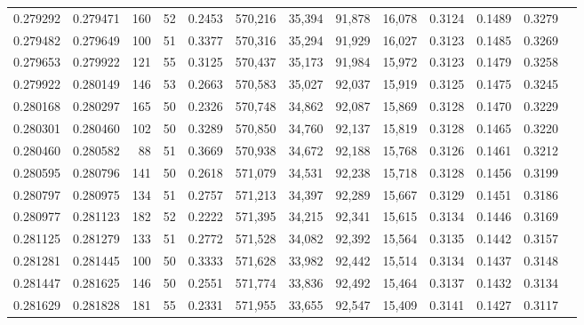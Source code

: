 \begin{tabular}{rrrrrrrrrrrrr}
0.279292 & 0.279471 &   160 &  52 &                                     0.2453 & 570,216 &  35,394 &  91,878 &  16,078 & 0.3124 & 0.1489 & 0.3279 \\
0.279482 & 0.279649 &   100 &  51 &                                     0.3377 & 570,316 &  35,294 &  91,929 &  16,027 & 0.3123 & 0.1485 & 0.3269 \\
0.279653 & 0.279922 &   121 &  55 &                                     0.3125 & 570,437 &  35,173 &  91,984 &  15,972 & 0.3123 & 0.1479 & 0.3258 \\
0.279922 & 0.280149 &   146 &  53 &                                     0.2663 & 570,583 &  35,027 &  92,037 &  15,919 & 0.3125 & 0.1475 & 0.3245 \\
0.280168 & 0.280297 &   165 &  50 &                                     0.2326 & 570,748 &  34,862 &  92,087 &  15,869 & 0.3128 & 0.1470 & 0.3229 \\
0.280301 & 0.280460 &   102 &  50 &                                     0.3289 & 570,850 &  34,760 &  92,137 &  15,819 & 0.3128 & 0.1465 & 0.3220 \\
0.280460 & 0.280582 &    88 &  51 &                                     0.3669 & 570,938 &  34,672 &  92,188 &  15,768 & 0.3126 & 0.1461 & 0.3212 \\
0.280595 & 0.280796 &   141 &  50 &                                     0.2618 & 571,079 &  34,531 &  92,238 &  15,718 & 0.3128 & 0.1456 & 0.3199 \\
0.280797 & 0.280975 &   134 &  51 &                                     0.2757 & 571,213 &  34,397 &  92,289 &  15,667 & 0.3129 & 0.1451 & 0.3186 \\
0.280977 & 0.281123 &   182 &  52 &                                     0.2222 & 571,395 &  34,215 &  92,341 &  15,615 & 0.3134 & 0.1446 & 0.3169 \\
0.281125 & 0.281279 &   133 &  51 &                                     0.2772 & 571,528 &  34,082 &  92,392 &  15,564 & 0.3135 & 0.1442 & 0.3157 \\
0.281281 & 0.281445 &   100 &  50 &                                     0.3333 & 571,628 &  33,982 &  92,442 &  15,514 & 0.3134 & 0.1437 & 0.3148 \\
0.281447 & 0.281625 &   146 &  50 &                                     0.2551 & 571,774 &  33,836 &  92,492 &  15,464 & 0.3137 & 0.1432 & 0.3134 \\
0.281629 & 0.281828 &   181 &  55 &                                     0.2331 & 571,955 &  33,655 &  92,547 &  15,409 & 0.3141 & 0.1427 & 0.3117 \\

\end{tabular}
